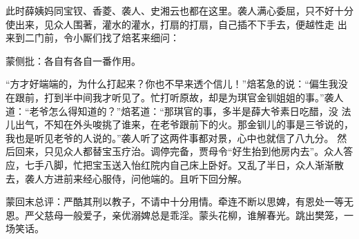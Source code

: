 \begin{parag}
    此时薛姨妈同宝钗、香菱、袭人、史湘云也都在这里。袭人满心委屈，只不好十分使出来，见众人围著，灌水的灌水，打扇的打扇，自己插不下手去，便越性走 出来到二门前，令小厮们找了焙茗来细问：\begin{note}蒙侧批：各自有各自一番作用。\end{note}“方才好端端的，为什么打起来？你也不早来透个信儿！”焙茗急的说：“偏生我没在跟前，打到半中间我才听见了。忙打听原故，却是为琪官金钏姐姐的事。”袭人道：“老爷怎么得知道的？”焙茗道：“那琪官的事，多半是薛大爷素日吃醋，没 法儿出气，不知在外头唆挑了谁来，在老爷跟前下的火。那金钏儿的事是三爷说的，我也是听见老爷的人说的。”袭人听了这两件事都对景，心中也就信了八九分。 然后回来，只见众人都替宝玉疗治。调停完备，贾母令“好生抬到他房内去”。众人答应，七手八脚，忙把宝玉送入怡红院内自己床上卧好。又乱了半日，众人渐渐散去，袭人方进前来经心服侍，问他端的。且听下回分解。
\end{parag}


\begin{parag}
    \begin{note}蒙回末总评：严酷其刑以教子，不请中十分用情。牵连不断以思婢，有恩处一等无恩。严父慈母一般爱子，亲优溺婢总是乖淫。蒙头花柳，谁解春光。跳出樊笼，一场笑话。\end{note}
\end{parag}

